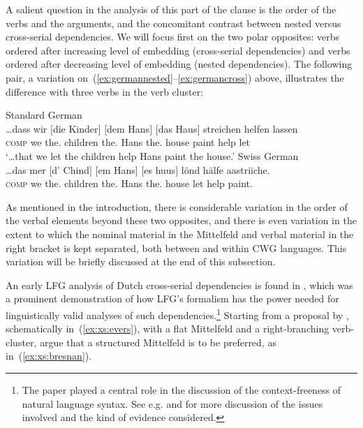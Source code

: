 \documentclass[output=paper,hidelinks]{langscibook}
\begin{document}
A salient question in the analysis of this part of the clause is the
order of the verbs and the arguments, and the concomitant contrast
between nested versus cross-serial dependencies. We will focus first
on the two polar opposites: verbs ordered after increasing level of
embedding (cross-serial dependencies) and verbs ordered after
decreasing level of embedding (nested dependencies). The following pair, a variation on~(\ref{ex:germannested}--\ref{ex:germancross}) above, illustrates the difference with three verbs in the verb cluster: 
%
\begin{exe}
  \ex
  \begin{xlist}
  \ex Standard German\\
      {\gll
        \ldots{}dass wir $[$die Kinder$]$ $[$dem Hans$]$ $[$das Haus$]$ streichen helfen lassen\\
        \phantom{\ldots}\textsc{comp} we \phantom{$[$}the.\ACC{} children \phantom{$[$}the.\DAT{} Hans \phantom{$[$}the.\ACC{} house paint help let\\
          }
    \glt `\ldots that we let the children help Hans paint the house.'
\ex Swiss German \citep[§2, example~5]{Shieber1985}\\
    {\gll
      \ldots{}das mer $[$d' Chind$]$ $[$em Hans$]$ $[$es huus$]$ lönd hälfe aastriiche.\\
        \phantom{\ldots}\textsc{comp} we \phantom{$[$}the.\ACC{} children \phantom{$[$}the.\DAT{} Hans \phantom{$[$}the.\ACC{} house let help paint.\\}
  \end{xlist}
\end{exe}
%
As mentioned in the introduction, there is considerable variation in
the order of the verbal elements beyond these two opposites, and there
is even variation in the extent to which the nominal material in the
Mittelfeld and verbal material in the right bracket is kept separated,
both between and within CWG languages. This variation will be
briefly discussed at the end of this subsection.

 An early LFG analysis of Dutch
cross-serial dependencies is found in \citet{BKPZ:Dutch}, which was a
prominent demonstration of how LFG's formalism has the power needed
for linguistically valid analyses of such dependencies.\footnote{The
paper played a central role in the discussion of the context-freeness
of natural language syntax. See e.g. \citet{pullum-gazdar1982} and
\citet{Shieber1985} for more discussion of the issues involved and the
kind of evidence considered.} Starting from a proposal by
\citet{evers:1975}, schematically in~(\ref{ex:xs:evers}), with a flat
Mittelfeld and a right-branching verb-cluster, \citeauthor{BKPZ:Dutch}
argue that a structured Mittelfeld is to be preferred, as
in~(\ref{ex:xs:bresnan}).
\end{document}
